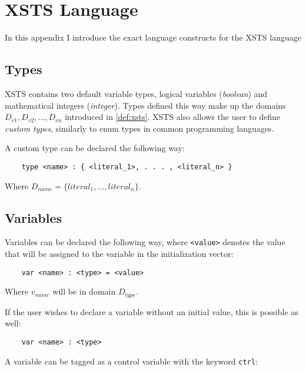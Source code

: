 \clearpage\section{XSTS Language}\label{sec:xsts_language}

In this appendix I introduce the exact language constructs for the XSTS language 

\subsection{Types}

XSTS contains two default variable types, logical variables (\emph{boolean}) and mathematical integers (\emph{integer}). Types defined this way make up the domains \(D_{v1}, D_{v2}, \dots, D_{vn}\) introduced in \autoref{def:xsts}. XSTS also allows the user to define \emph{custom types}, similarly to enum types in common programming languages.

A custom type can be declared the following way:

\begin{lstlisting}
	type <name> : { <literal_1>, . . . , <literal_n> }
\end{lstlisting}

Where \(D_{name} = \{ literal_1, \dots, literal_n \}\).

\subsection{Variables}

Variables can be declared the following way, where \verb|<value>| denotes the value that will be assigned to the variable in the initialization vector:

\begin{lstlisting}
	var <name> : <type> = <value>
\end{lstlisting}

Where \(v_{name}\) will be in domain \(D_{type}\).

If the user wishes to declare a variable without an initial value, this is possible as well:

\begin{lstlisting}
	var <name> : <type>
\end{lstlisting}

A variable can be tagged as a control variable with the keyword \verb|ctrl|:


